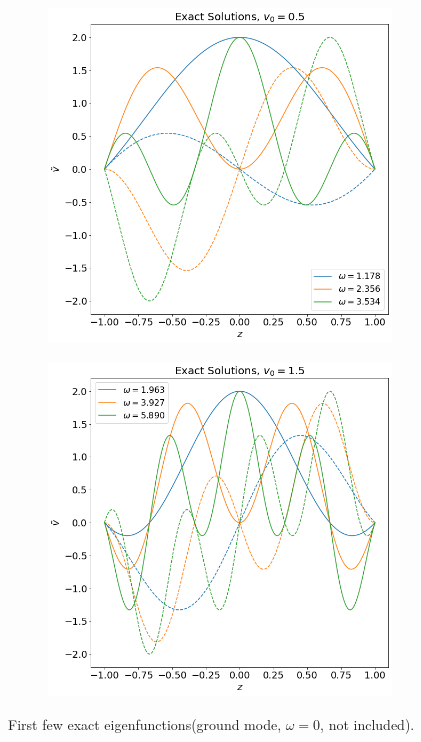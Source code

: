 \documentclass{article}
\begin{document}
\begin{figure}[H]
    \centering
    \begin{subfigure}[b]{0.45\linewidth}
        \includegraphics[width=\linewidth]{img/eigenfunctions-exact-v0=0.5.png}
        \caption{}
    \end{subfigure}%
    \begin{subfigure}[b]{0.45\linewidth}
        \includegraphics[width=\linewidth]{img/eigenfunctions-exact-v0=1.5.png}
        \caption{}
    \end{subfigure}
    \caption{First few exact eigenfunctions(ground mode, $\omega=0$, not included).}
    \label{fig:eigenvectors-constant-v}
\end{figure}
\end{document}
